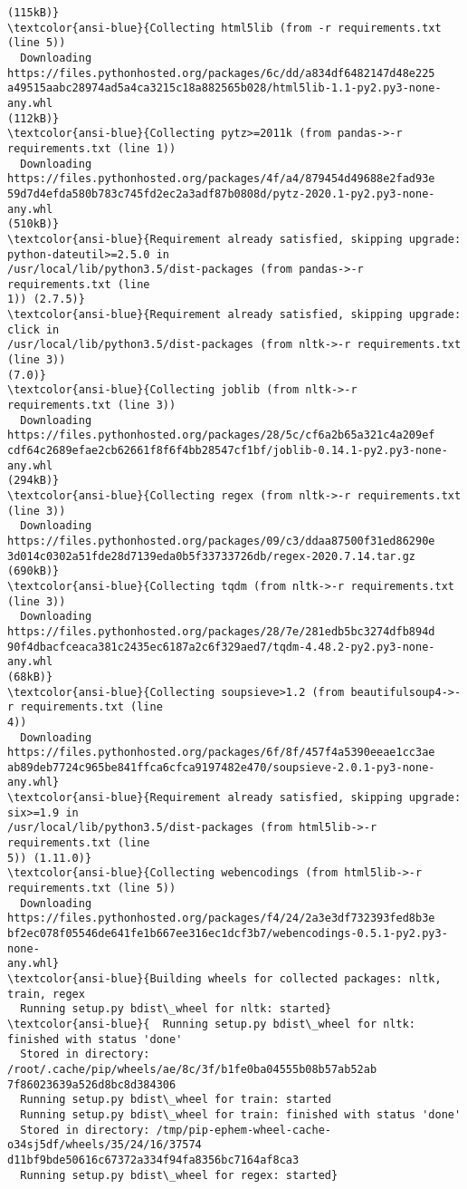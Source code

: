 \documentclass[11pt]{article}
\begin{document}
\begin{Verbatim}[commandchars=\\\{\}]
(115kB)}
\textcolor{ansi-blue}{Collecting html5lib (from -r requirements.txt (line 5))
  Downloading https://files.pythonhosted.org/packages/6c/dd/a834df6482147d48e225
a49515aabc28974ad5a4ca3215c18a882565b028/html5lib-1.1-py2.py3-none-any.whl
(112kB)}
\textcolor{ansi-blue}{Collecting pytz>=2011k (from pandas->-r requirements.txt (line 1))
  Downloading https://files.pythonhosted.org/packages/4f/a4/879454d49688e2fad93e
59d7d4efda580b783c745fd2ec2a3adf87b0808d/pytz-2020.1-py2.py3-none-any.whl
(510kB)}
\textcolor{ansi-blue}{Requirement already satisfied, skipping upgrade: python-dateutil>=2.5.0 in
/usr/local/lib/python3.5/dist-packages (from pandas->-r requirements.txt (line
1)) (2.7.5)}
\textcolor{ansi-blue}{Requirement already satisfied, skipping upgrade: click in
/usr/local/lib/python3.5/dist-packages (from nltk->-r requirements.txt (line 3))
(7.0)}
\textcolor{ansi-blue}{Collecting joblib (from nltk->-r requirements.txt (line 3))
  Downloading https://files.pythonhosted.org/packages/28/5c/cf6a2b65a321c4a209ef
cdf64c2689efae2cb62661f8f6f4bb28547cf1bf/joblib-0.14.1-py2.py3-none-any.whl
(294kB)}
\textcolor{ansi-blue}{Collecting regex (from nltk->-r requirements.txt (line 3))
  Downloading https://files.pythonhosted.org/packages/09/c3/ddaa87500f31ed86290e
3d014c0302a51fde28d7139eda0b5f33733726db/regex-2020.7.14.tar.gz (690kB)}
\textcolor{ansi-blue}{Collecting tqdm (from nltk->-r requirements.txt (line 3))
  Downloading https://files.pythonhosted.org/packages/28/7e/281edb5bc3274dfb894d
90f4dbacfceaca381c2435ec6187a2c6f329aed7/tqdm-4.48.2-py2.py3-none-any.whl
(68kB)}
\textcolor{ansi-blue}{Collecting soupsieve>1.2 (from beautifulsoup4->-r requirements.txt (line
4))
  Downloading https://files.pythonhosted.org/packages/6f/8f/457f4a5390eeae1cc3ae
ab89deb7724c965be841ffca6cfca9197482e470/soupsieve-2.0.1-py3-none-any.whl}
\textcolor{ansi-blue}{Requirement already satisfied, skipping upgrade: six>=1.9 in
/usr/local/lib/python3.5/dist-packages (from html5lib->-r requirements.txt (line
5)) (1.11.0)}
\textcolor{ansi-blue}{Collecting webencodings (from html5lib->-r requirements.txt (line 5))
  Downloading https://files.pythonhosted.org/packages/f4/24/2a3e3df732393fed8b3e
bf2ec078f05546de641fe1b667ee316ec1dcf3b7/webencodings-0.5.1-py2.py3-none-
any.whl}
\textcolor{ansi-blue}{Building wheels for collected packages: nltk, train, regex
  Running setup.py bdist\_wheel for nltk: started}
\textcolor{ansi-blue}{  Running setup.py bdist\_wheel for nltk: finished with status 'done'
  Stored in directory: /root/.cache/pip/wheels/ae/8c/3f/b1fe0ba04555b08b57ab52ab
7f86023639a526d8bc8d384306
  Running setup.py bdist\_wheel for train: started
  Running setup.py bdist\_wheel for train: finished with status 'done'
  Stored in directory: /tmp/pip-ephem-wheel-cache-o34sj5df/wheels/35/24/16/37574
d11bf9bde50616c67372a334f94fa8356bc7164af8ca3
  Running setup.py bdist\_wheel for regex: started}


\end{Verbatim}
\end{document}
